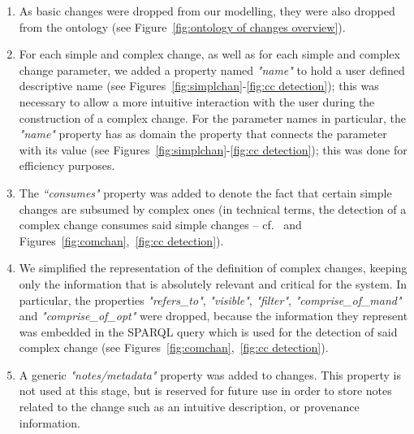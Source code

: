 \begin{enumerate}

\item As basic changes were dropped from our modelling, they were also dropped from the ontology (see Figure~\ref{fig:ontology of changes overview}).

\item For each simple and complex change, as well as for each simple and complex change parameter, we added a property named \textit{"name"} to hold a user defined descriptive name 
(see Figures~\ref{fig:simplchan}-\ref{fig:cc detection}); 
this was necessary to allow a more intuitive interaction with the user during the construction of a complex change.
For the parameter names in particular, the \textit{"name"} property has as domain the property that connects the parameter with its value (see Figures~\ref{fig:simplchan}-\ref{fig:cc detection}); this was done for efficiency purposes.

\item The \textit{``consumes"} property was added to denote the fact that certain simple changes are subsumed by complex ones (in technical terms, the detection of a complex change consumes said simple changes -- cf.~\cite{d3.1} and 
Figures~\ref{fig:comchan},~\ref{fig:cc detection}).

\item We simplified the representation of the definition of complex changes, keeping only the information that is absolutely relevant and critical for the system. In particular, the properties 
\textit{"refers\_to"}, \textit{"visible"}, \textit{"filter"}, \textit{"comprise\_of\_mand"} and \textit{"comprise\_of\_opt"} were dropped, because the information they represent was embedded in the SPARQL query which is used for the detection of said complex change (see Figures~\ref{fig:comchan},~\ref{fig:cc detection}).

\item A generic \textit{"notes/metadata"} property was added to changes. This property is not used at this stage, but is reserved for future use in order to store notes related to the change such as an intuitive description, or provenance information.


\end{enumerate}
